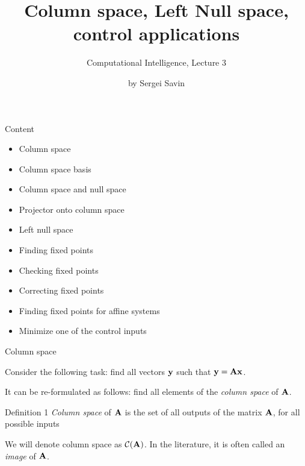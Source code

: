 \documentclass{beamer}
\title{Column space, Left Null space, control applications}
\subtitle{Computational Intelligence, Lecture 3}
\author{by Sergei Savin}
\date{\mydate}
\begin{document}
\maketitle


\begin{frame}{Content}

\begin{itemize}
\item Column space
\item Column space basis
\item Column space and null space
\item Projector onto column space
\item Left null space
\item Finding fixed points
\item Checking fixed points
\item Correcting fixed points
\item Finding fixed points for affine systems
\item Minimize one of the control inputs
\end{itemize}

\end{frame}





\begin{frame}{Column space}
\begin{flushleft}

Consider the following task: find all vectors $\mathbf{y}$ such that $\mathbf{y} = \mathbf{A} \mathbf{x}$.

\bigskip

It can be re-formulated as follows: find all elements of the \emph{column space} of $\mathbf{A}$.

\begin{block}{Definition 1}
  \emph{Column space} of $\mathbf{A}$ is the set of all outputs of the matrix $\mathbf{A}$, for all possible inputs
\end{block}

\bigskip

We will denote column space as $\mathcal{C}(\mathbf{A})$. In the literature, it is often called an \emph{image} of $\mathbf{A}$.

\end{flushleft}
\end{frame}
\end{document}
